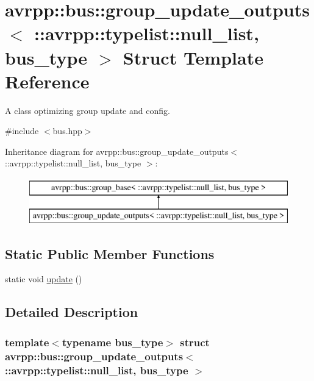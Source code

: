 \hypertarget{structavrpp_1_1bus_1_1group__update__outputs_3_01_1_1avrpp_1_1typelist_1_1null__list_00_01bus__type_01_4}{
\section{avrpp::bus::group\_\-update\_\-outputs$<$ ::avrpp::typelist::null\_\-list, bus\_\-type $>$ Struct Template Reference}
\label{structavrpp_1_1bus_1_1group__update__outputs_3_01_1_1avrpp_1_1typelist_1_1null__list_00_01bus__type_01_4}
}


A class optimizing group update and config.  




{\ttfamily \#include $<$bus.hpp$>$}

Inheritance diagram for avrpp::bus::group\_\-update\_\-outputs$<$ ::avrpp::typelist::null\_\-list, bus\_\-type $>$:\begin{figure}[H]
\begin{center}
\leavevmode
\includegraphics[height=2.000000cm]{structavrpp_1_1bus_1_1group__update__outputs_3_01_1_1avrpp_1_1typelist_1_1null__list_00_01bus__type_01_4}
\end{center}
\end{figure}
\subsection*{Static Public Member Functions}
\begin{DoxyCompactItemize}
\item 
static void \hyperlink{structavrpp_1_1bus_1_1group__update__outputs_3_01_1_1avrpp_1_1typelist_1_1null__list_00_01bus__type_01_4_a4022107c21be2ee5f08339934efbafe0}{update} ()
\end{DoxyCompactItemize}


\subsection{Detailed Description}
\subsubsection*{template$<$typename bus\_\-type$>$ struct avrpp::bus::group\_\-update\_\-outputs$<$ ::avrpp::typelist::null\_\-list, bus\_\-type $>$}

